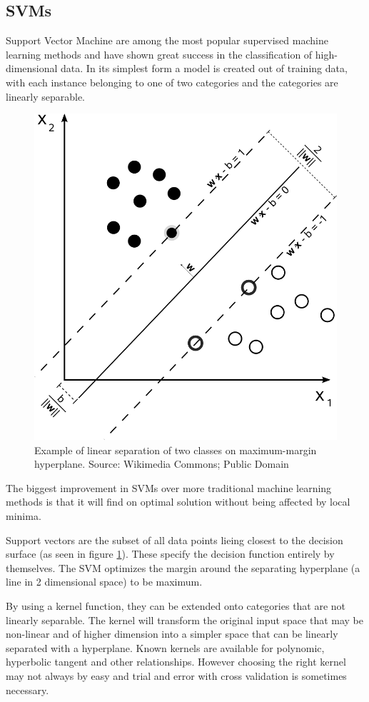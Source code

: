\subsection{SVMs}


Support Vector Machine are among the most popular supervised machine learning methods and have shown great success in the classification of high-dimensional data. In its simplest form a model is created out of training data, with each instance belonging to one of two categories and the categories are linearly separable.


\begin{figure}[h]
    \centering
	\includegraphics[width=.5\textwidth]{./images/illustrations/svm}
    \caption{Example of linear separation of two classes on maximum-margin hyperplane. Source: Wikimedia Commons; Public Domain}
    \label{fig:svm}
\end{figure}

The biggest improvement in SVMs over more traditional machine learning methods is that it will find on optimal solution without being affected by local minima.

Support vectors are the subset of all data points lieing closest to the decision surface (as seen in figure \ref{fig:svm}). These specify the decision function entirely by themselves. The SVM optimizes the margin around the separating hyperplane (a line in 2 dimensional space) to be maximum.

By using a kernel function, they can be extended onto categories that are not linearly separable. The kernel will transform the original input space that may be non-linear and of higher dimension into a simpler space that can be linearly separated with a hyperplane. Known kernels are available for polynomic, hyperbolic tangent and other relationships. However choosing the right kernel may not always by easy and trial and error with cross validation is sometimes necessary.

